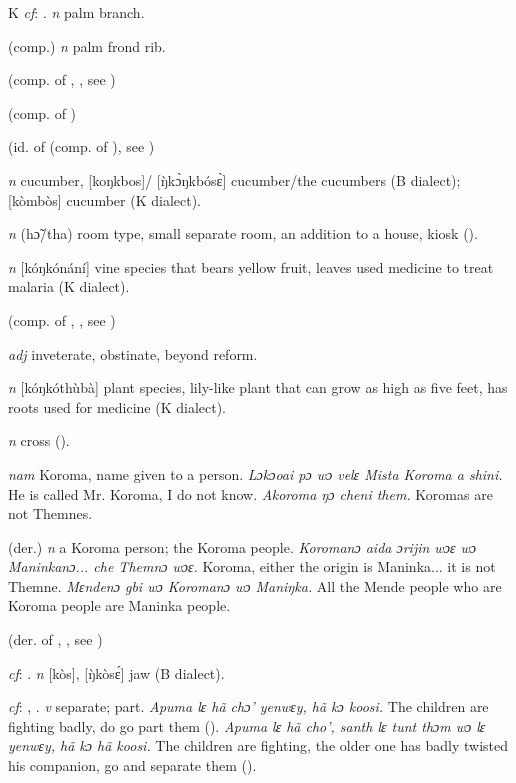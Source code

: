 \begin{letter}{K}
 \textit{cf}: . \textit{n} palm branch.

 (comp.) \textit{n} palm frond rib.

 (comp. of , , see ) 

 (comp. of ) 

 (id. of  (comp. of ), see ) 

 \textit{n} cucumber, [koŋkbos]/ [ŋ̀kɔ̀ŋkbósɛ̀] cucumber/the cucumbers (B dialect); [kòmbòs] cucumber (K dialect).

 \textit{n} (hɔ̃/tha) room type, small separate room, an addition to a house, kiosk (\citealt{Pichl1967}). 

 \textit{n} [kóŋkónání] vine species that bears yellow fruit, leaves used medicine to treat malaria (K dialect).

 (comp. of , , see ) 

 \textit{adj} inveterate, obstinate, beyond reform.

 \textit{n} [kóŋkóthùbà] plant species, lily-like plant that can grow as high as five feet, has roots used for medicine (K dialect). 

 \textit{n} cross (\citealt{Pichl1967}). 

 \textit{nam} Koroma, name given to a person. \textit{Lɔkɔoai pɔ wɔ velɛ Mista Koroma a shini.} He is called Mr. Koroma, I do not know. \textit{Akoroma ŋɔ cheni them.} Koromas are not Themnes.

 (der.) \textit{n} a Koroma person; the Koroma people. \textit{Koromanɔ aida ɔrijin wɔɛ wɔ Maninkanɔ... che Themnɔ wɔɛ.} Koroma, either the origin is Maninka... it is not Themne. \textit{Mɛndenɔ gbi wɔ Koromanɔ wɔ Maniŋka.} All the Mende people who are Koroma people are Maninka people.

 (der. of , , see ) 

 \textit{cf}: . \textit{n} [kòs], [\`{ŋ}kòsɛ́] jaw (B dialect).

 \textit{cf}: , . \textit{v} separate; part. \textit{Apuma lɛ hã chɔ' yenwɛy, hã kɔ koosi.} The children are fighting badly, do go part them (\citealt{Pichl1967}). \textit{Apuma lɛ hã cho', santh lɛ tunt thɔm wɔ lɛ yenwɛy, hã kɔ hã koosi.} The children are fighting, the older one has badly twisted his companion, go and separate them (\citealt{Pichl1967}). 


\end{letter}
